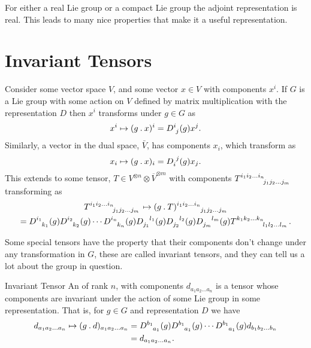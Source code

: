 \documentclass[fleqn]{NotesClass}
\newcommand{\action}{\mathbin{.}}
\begin{document}
    For either a real Lie group or a compact Lie group the adjoint representation is real.
    This leads to many nice properties that make it a useful representation.
    
    \section{Invariant Tensors}
    Consider some vector space \(V\), and some vector \(x \in V\) with components \(x^i\).
    If \(G\) is a Lie group with some action on \(V\) defined by matrix multiplication with the representation \(D\) then \(x^i\) transforms under \(g \in G\) as
    \begin{equation}
        x^i \mapsto (g\action x)^i = \tensor{D}{^i_j}(g)x^j.
    \end{equation}
    Similarly, a vector in the dual space, \(\bar{V}\), has components \(x_i\), which transform as
    \begin{equation}
        x_i \mapsto (g\action x)_i = \tensor{D}{_i^j}(g)x_j.
    \end{equation}
    This extends to some tensor, \(T \in V^{\otimes n} \otimes \overbar{V}^{\otimes m}\) with components \(\tensor{T}{^{i_1i_2\dotso i_n}_{j_1j_2\dotso j_m}}\) transforming as
    \begin{multline*}
        \tensor{T}{^{i_1i_2\dotso i_n}_{j_1j_2\dotso j_m}} \mapsto \tensor{(g\action T)}{^{i_1i_2\dotso i_n}_{j_1j_2\dotso j_m}}\\
        = \tensor{D}{^{i_1}_{k_1}}(g)\tensor{D}{^{i_2}_{k_2}}(g) \dotsm \tensor{D}{^{i_n}_{k_n}}(g) \tensor{D}{_{j_1}^{l_1}}(g) \tensor{D}{_{j_2}^{l_2}}(g) \tensor{D}{_{j_m}^{l_m}}(g) \tensor{T}{^{k_1k_2\dotso k_n}_{l_1l_2\dotso l_m}}.
    \end{multline*}
    
    Some special tensors have the property that their components don't change under any transformation in \(G\), these are called invariant tensors, and they can tell us a lot about the group in question.
    
    \begin{dfn}{Invariant Tensor}{}
        An  of rank \(n\), with components \(d_{a_1a_2\dotso a_n}\) is a tensor whose components are invariant under the action of some Lie group in some representation.
        That is, for \(g \in G\) and representation \(D\) we have
        \begin{align}
            d_{a_1a_2\dotso a_n} \mapsto (g \action d)_{a_1a_2\dotso a_n} &= \tensor{D}{^{b_1}_{a_1}}(g)\tensor{D}{^{b_1}_{a_1}}(g) \dotsm \tensor{D}{^{b_1}_{a_1}}(g) d_{b_1b_2\dotso b_n}\notag\\
            &= d_{a_1a_2\dotso a_n}.
        \end{align}
    \end{dfn}
    
\end{document}
